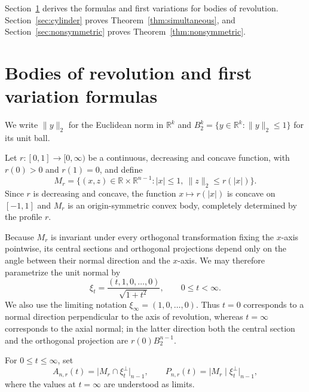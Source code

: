 \documentclass[11pt]{article}
\theoremstyle{remark}
\newcommand{\R}{\mathbb{R}}
\newcommand{\abs}[1]{\lvert #1\rvert}
\newcommand{\norm}[1]{\lVert #1\rVert}
\begin{document}
Section~\ref{sec:formulas} derives the formulas and first variations for
bodies of revolution.  Section~\ref{sec:cylinder} proves
Theorem~\ref{thm:simultaneous}, and Section~\ref{sec:nonsymmetric} proves
Theorem~\ref{thm:nonsymmetric}.
\section{Bodies of revolution and first variation formulas}
\label{sec:formulas}

We write $\norm{y}_2$ for the Euclidean norm in $\R^k$ and
$B_2^k=\{y\in\R^k:\norm{y}_2\leq1\}$ for its unit ball.

Let $r:[0,1]\to[0,\infty)$ be a continuous, decreasing and concave function, with $r(0)>0$ and
$r(1)=0$, and define
\begin{equation}\label{eq:Mr}
 M_r=\{(x,z)\in\R\times\R^{n-1}:\abs x\leq1,
                  \ \norm z_2\leq r(\abs x)\}.
\end{equation}
Since $r$ is decreasing and concave, the function
$x\mapsto r(\abs{x})$ is concave on $[-1,1]$ and  $M_r$ is an origin-symmetric
convex body, completely determined by the profile $r$.


Because \(M_r\) is invariant under every orthogonal transformation fixing
the \(x\)-axis pointwise, its central sections and orthogonal projections
depend only on the angle between their normal direction and the \(x\)-axis.
We may therefore parametrize the unit normal by
\begin{equation}\label{eq:tdef}
 \xi_t=\frac{(t,1,0,\ldots,0)}{\sqrt{1+t^2}},
 \qquad 0\leq t<\infty.
\end{equation}
We also use the limiting notation
\(\xi_\infty=(1,0,\ldots,0)\).  Thus \(t=0\) corresponds to a normal
direction perpendicular to the axis of revolution, whereas \(t=\infty\)
corresponds to the axial normal; in the latter direction both the central
section and the orthogonal projection are $r(0)B_2^{n-1}$.

For \(0\leq t\leq\infty\), set
\[
 A_{n,r}(t)
 =\bigl|M_r\cap\xi_t^\perp\bigr|_{n-1},
 \qquad
 P_{n,r}(t)
 =\bigl|M_r\mid\xi_t^\perp\bigr|_{n-1},
\]
where the values at \(t=\infty\) are understood as limits.
\end{document}
